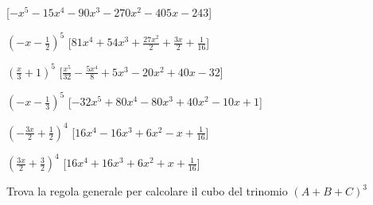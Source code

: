 \begin{esercizio}
\begin{enumeratea}
  \hfill [\(- x^{5} - 15 x^{4} - 90 x^{3} - 270 x^{2} - 405 x - 243\)]
\item \(\left(- x - \frac{1}{2}\right)^{5}\)
  \hfill [\(81 x^{4} + 54 x^{3} + \frac{27 x^{2}}{2} + \frac{3 x}{2} + 
\frac{1}{16}\)]
\item \(\left(\frac{x}{3} + 1\right)^{5}\)
  \hfill [\(\frac{x^{5}}{32} - \frac{5 x^{4}}{8} + 5 x^{3} - 20 x^{2} + 40 
x - 32\)]
\item \(\left(- x - \frac{1}{3}\right)^{5}\)
  \hfill [\(- 32 x^{5} + 80 x^{4} - 80 x^{3} + 40 x^{2} - 10 x + 1\)]
\item \(\left(- \frac{3 x}{2} + \frac{1}{2}\right)^{4}\)
  \hfill [\(16 x^{4} - 16 x^{3} + 6 x^{2} - x + \frac{1}{16}\)]
\item \(\left(\frac{3 x}{2} + \frac{3}{2}\right)^{4}\)
  \hfill [\(16 x^{4} + 16 x^{3} + 6 x^{2} + x + \frac{1}{16}\)]
\end{enumeratea}
\end{esercizio}

\begin{esercizio}
 \label{ese:11.30}
 Trova la regola generale per calcolare il cubo del trinomio
$(A+B+C)^{3}$
\end{esercizio}


